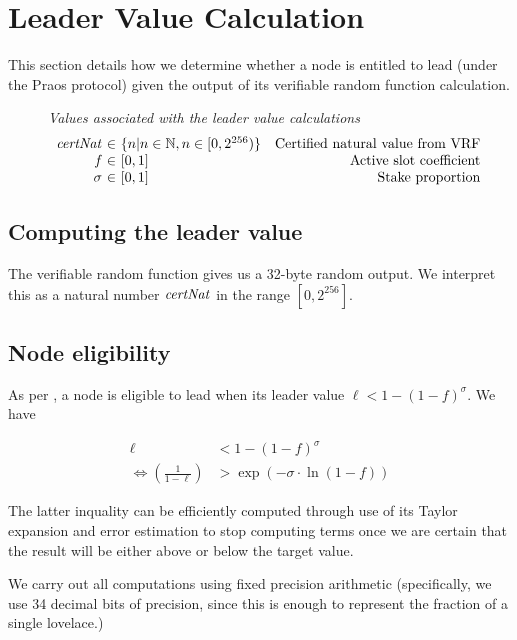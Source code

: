\section{Leader Value Calculation}
\label{sec:leader-value-calc}

This section details how we determine whether a node is entitled to lead (under
the Praos protocol) given the output of its verifiable random function
calculation.

\begin{figure}
  \emph{Values associated with the leader value calculations}
  \begin{equation*}
  \begin{array}{r@{~\in~}lr}
    \var{certNat} & \{n | n \in \N, n \in [0,2^{256})\} & \text{Certified natural value from VRF} \\
    \var{f} & [0,1] & \text{Active slot coefficient} \\
    \sigma & [0,1] & \text{Stake proportion}
  \end{array}
  \end{equation*}
\end{figure}

\subsection{Computing the leader value}

The verifiable random function gives us a 32-byte random output. We interpret
this as a natural number $\mathit{certNat}$ in the range $[0,2^{256}]$.

\subsection{Node eligibility}

As per \cite{ouroboros_praos}, a node is eligible to lead when its leader value
$\ell < 1 - (1 - f)^\sigma$. We have

\begin{align*}
  \ell & < 1 - (1 -f)^\sigma \\
  \iff \left(\frac{1}{1-\ell}\right) & > \exp{(-\sigma \cdot \ln{(1-f)})}
\end{align*}

The latter inquality can be efficiently computed through use of its Taylor
expansion and error estimation to stop computing terms once we are certain that
the result will be either above or below the target value.

We carry out all computations using fixed precision arithmetic (specifically, we
use 34 decimal bits of precision, since this is enough to represent the fraction
of a single lovelace.)

